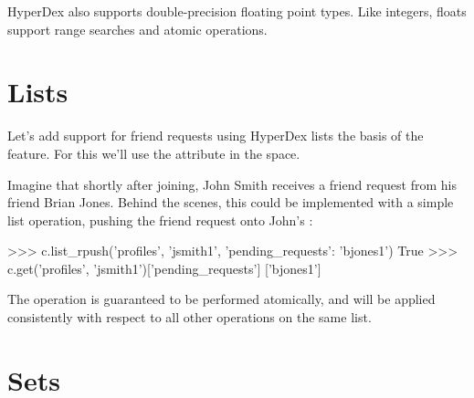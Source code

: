HyperDex also supports double-precision floating point types.  Like integers,
floats support range searches and atomic operations.

\section{Lists}
\label{sec:data-types:lists}

Let's add support for friend requests using HyperDex lists the basis of the
feature.  For this we'll use the  attribute in the
 space.
 
Imagine that shortly after joining, John Smith receives a friend request from
his friend Brian Jones.  Behind the scenes, this could be implemented with a
simple list operation, pushing the friend request onto John's
:

\begin{pythoncode}
>>> c.list_rpush('profiles', 'jsmith1', {'pending_requests': 'bjones1'})
True
>>> c.get('profiles', 'jsmith1')['pending_requests']
['bjones1']
\end{pythoncode}

The operation  is guaranteed to be performed atomically, and
will be applied consistently with respect to all other operations on the same
list.

\begin{comment} %
Note that lists provide both an lpush and rpush operation. The former adds the
new element at the head of the list, while the latter adds at the tail. They
also provide lpop operation for taking an element off the head of the list.
Coupled together, these operations provide a comprehensive list datatype that
can be used to implement fault-tolerant lists of all kinds. For instance, one
can implement work queues and generalized producer-consumer patterns on top of
HyperDex lists in a pretty straightforward fashion. In this case, producers
would push at one end of the list (the tail, with an rpush) and consumers would
pop from the other (the head, with a pop). Since the operations are atomic, no
additional synchronization would be necessary, enabling a high-performance
implementation.
\end{comment}

\section{Sets}
\label{sec:data-types:sets}

